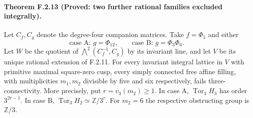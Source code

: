 \paragraph{Theorem F.2.13 (Proved: two further rational families excluded integrally).}
Let $C_f,C_g$ denote the degree-four companion matrices.
Take $f=\Phi_5$ and either
\[
 \text{case A: }g=\Phi_{12},\qquad
 \text{case B: }g=\Phi_3\Phi_6.
 \tag{F.36}
\]
Let $W$ be the quotient of
$\bigwedge^2(C_f^{-1},C_g)$ by its invariant line, and
let $V$ be its unique rational extension of F.2.11.
For every invariant integral lattice in $V$ with primitive
maximal square-zero cusp, every simply connected free affine
filling, with multiplicities $m_1,m_2$ divisible by five and
six respectively, fails three-connectivity.
More precisely, put $r=v_3(m_2)\geq1$.
In case A, $\operatorname{Tor}_3 H_3$ has order
$3^{2r-1}$.  In case B,
$\operatorname{Tor}_3 H_2\simeq\mathbb Z/3^r$.
For $m_2=6$ the respective obstructing group is $\mathbb Z/3$.

